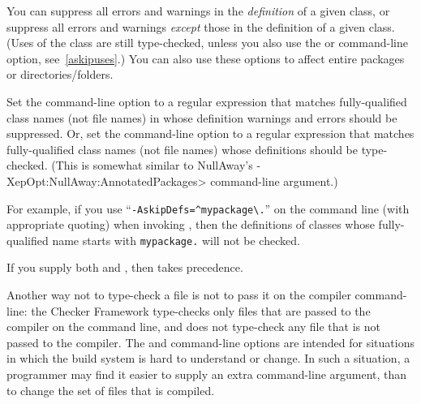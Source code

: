 


You can suppress all errors and warnings in the \emph{definition} of a given
class, or suppress all errors and warnings \emph{except} those in the definition
of a given class.  (Uses of the class are still type-checked, unless you also use
the  or  command-line option,
see~\ref{askipuses}.)
You can also use these options to affect entire packages or directories/folders.

Set the  command-line option to a
regular expression that matches fully-qualified class names (not file names) in whose definition warnings and errors
should be suppressed.
Or, set the  command-line option to a
regular expression that matches fully-qualified class names (not file names) whose
definitions should be type-checked.
(This is somewhat similar to NullAway's
\<-XepOpt:NullAway:AnnotatedPackages> command-line argument.)

For example, if you use
``{\codesize\verb|-AskipDefs=^mypackage\.|}'' on the command line
(with appropriate quoting) when invoking
, then the definitions of
classes whose fully-qualified name starts with \codesize\verb|mypackage.|
will not be checked.

If you supply both  and , then
 takes precedence.

Another way not to type-check a file is not to pass it on the compiler
command-line:  the Checker Framework type-checks only files that are passed
to the compiler on the command line, and does not type-check any file that
is not passed to the compiler.  The  and 
command-line options
are intended for situations in which the build system is hard to understand
or change.  In such a situation, a programmer may find it easier to supply
an extra command-line argument, than to change the set of files that is
compiled.


